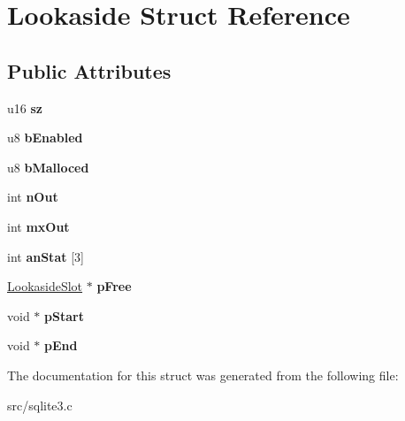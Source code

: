 \hypertarget{struct_lookaside}{\section{Lookaside Struct Reference}
\label{struct_lookaside}
}
\subsection*{Public Attributes}
\begin{DoxyCompactItemize}
\item 
\hypertarget{struct_lookaside_a2e8346b6cebbb64d9a6886a19ef843a1}{u16 {\bfseries sz}}\label{struct_lookaside_a2e8346b6cebbb64d9a6886a19ef843a1}

\item 
\hypertarget{struct_lookaside_adbe2c3486f893c30525e19388f35eb21}{u8 {\bfseries b\-Enabled}}\label{struct_lookaside_adbe2c3486f893c30525e19388f35eb21}

\item 
\hypertarget{struct_lookaside_a218f14cf9eb2c430867d286e9ac57ac5}{u8 {\bfseries b\-Malloced}}\label{struct_lookaside_a218f14cf9eb2c430867d286e9ac57ac5}

\item 
\hypertarget{struct_lookaside_a4cdd49fa554f877928d5bb31d55b32e9}{int {\bfseries n\-Out}}\label{struct_lookaside_a4cdd49fa554f877928d5bb31d55b32e9}

\item 
\hypertarget{struct_lookaside_a2ce364d95b55913df986999de442e4f9}{int {\bfseries mx\-Out}}\label{struct_lookaside_a2ce364d95b55913df986999de442e4f9}

\item 
\hypertarget{struct_lookaside_a7d875204cb05a327bb1652139faa4374}{int {\bfseries an\-Stat} \mbox{[}3\mbox{]}}\label{struct_lookaside_a7d875204cb05a327bb1652139faa4374}

\item 
\hypertarget{struct_lookaside_a318d2faa7f976f9d1b3c6e08bdc1d992}{\hyperlink{struct_lookaside_slot}{Lookaside\-Slot} $\ast$ {\bfseries p\-Free}}\label{struct_lookaside_a318d2faa7f976f9d1b3c6e08bdc1d992}

\item 
\hypertarget{struct_lookaside_a47073fcdffdc5a7a1464f0d09bfc17f9}{void $\ast$ {\bfseries p\-Start}}\label{struct_lookaside_a47073fcdffdc5a7a1464f0d09bfc17f9}

\item 
\hypertarget{struct_lookaside_ad3555c5558e104f2b82f62bf642cf831}{void $\ast$ {\bfseries p\-End}}\label{struct_lookaside_ad3555c5558e104f2b82f62bf642cf831}

\end{DoxyCompactItemize}


The documentation for this struct was generated from the following file\-:\begin{DoxyCompactItemize}
\item 
src/sqlite3.\-c\end{DoxyCompactItemize}
